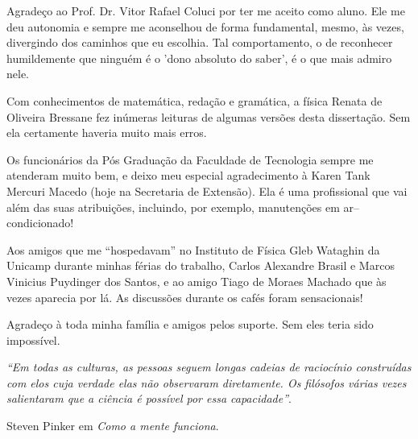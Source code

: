 \begin{agradecimentos}
    \thispagestyle{empty}
    
		Agradeço ao Prof. Dr. Vitor Rafael Coluci por ter me aceito como aluno. Ele me deu autonomia e sempre me aconselhou de forma fundamental, mesmo, às vezes, divergindo dos caminhos que eu escolhia. Tal comportamento, o de reconhecer humildemente que ninguém é o 'dono absoluto do saber', é o que mais admiro nele.
		
		Com conhecimentos de matemática, redação e gramática, a física Renata de Oliveira Bressane fez inúmeras leituras de algumas versões desta dissertação. Sem ela certamente haveria muito mais erros.
		
		Os funcionários da Pós Graduação da Faculdade de Tecnologia sempre me atenderam muito bem, e deixo meu especial agradecimento à Karen Tank Mercuri Macedo (hoje na Secretaria de Extensão). Ela é uma profissional que vai além das suas atribuições, incluindo, por exemplo, manutenções em ar--condicionado!
		
		Aos amigos que me ``hospedavam'' no Instituto de Física Gleb Wataghin da Unicamp durante minhas férias do trabalho, Carlos Alexandre Brasil e Marcos Vinicius Puydinger dos Santos, e ao amigo Tiago de Moraes Machado que às vezes aparecia por lá. As discussões durante os cafés foram sensacionais!
		
		Agradeço à toda minha família e amigos pelos suporte. Sem eles teria sido impossível.
		
\end{agradecimentos}


\begin{epigrafe}
	\thispagestyle{empty}
    \vspace*{\fill}
	\begin{flushright}
		\textit{``Em todas as culturas, as pessoas seguem longas cadeias de raciocínio construídas com elos cuja verdade elas não observaram diretamente. Os filósofos várias vezes salientaram que a ciência é possível por essa capacidade”}.
		
		\vspace{0.5cm}
		
		Steven Pinker em \textit{Como a mente funciona}.
	\end{flushright}
\end{epigrafe}


